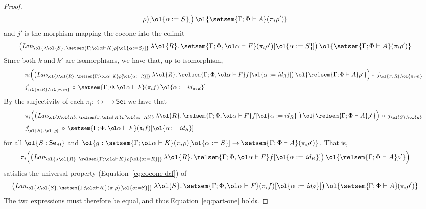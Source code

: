 \documentclass{lmcs}
\theoremstyle{plain}\newtheorem{satz}[thm]{Satz}
\newcommand{\set}{\mathsf{Set}}
\renewcommand{\id}{\mathit{id}}
\begin{document}
\begin{proof}
\[\rho)[\ol{\alpha := S}]\big)\, \ol{\setsem{\Gamma; \Phi \vdash
    A}(\pi_i \rho')}
\]
and $j'$ is the morphism mapping the cocone into the colimit
\[
\big(\textit{Lan}_{\ol{\lambda \ol{S}.\,\setsem{\Gamma; \ol\alpha
      \vdash K}\rho[\ol{\alpha := S}]}}\, \lambda
\ol{R}.\,\setsem{\Gamma; \Phi, \ol\alpha \vdash F}(\pi_i
\rho')[\ol{\alpha := S}]\big)\, \ol{\setsem{\Gamma; \Phi \vdash
    A}(\pi_i \rho')}
\]
Since both $k$ and $k'$ are isomorphisms, we have that, up to
isomorphism, 
\[\begin{array}{lll}
& & \pi_i \Big( \big(\textit{Lan}_{\ol{\lambda
    \ol{R}.\,\relsem{\Gamma; \ol\alpha \vdash K}\rho[\ol{\alpha :=
        R}]}}\, \lambda \ol{R}.\,\relsem{\Gamma; \Phi, \ol\alpha
  \vdash F}f[\ol{\alpha := \id_R}]\big)\, \ol{\relsem{\Gamma; \Phi
    \vdash A}\rho'} \Big) \circ\, j_{\ol{\pi_i R},
  \ol{\pi_i m}} \\[2ex]
& = & j'_{\ol{\pi_i R}, \ol{\pi_i m}} \,\circ\, \setsem{\Gamma; \Phi,
      \ol\alpha \vdash F} (\pi_i f)[\ol{\alpha := \id_{\pi_i R}}]
\end{array}\]
By the surjectivity of each $\pi_i : \rel \to \set$ we have that
\[\begin{array}{lll}
& & \pi_i \Big( \big(\textit{Lan}_{\ol{\lambda
    \ol{R}.\,\relsem{\Gamma; 
      \ol\alpha \vdash K}\rho[\ol{\alpha := R}]}}\, \lambda
\ol{R}.\,\relsem{\Gamma; \Phi, \ol\alpha \vdash F}f[\ol{\alpha :=
    \id_R}]\big)\, \ol{\relsem{\Gamma; \Phi \vdash A}\rho'} \Big)
\,\circ\, j_{\ol{S}, \ol{g}} \\[2ex]
& = & j'_{\ol{S}, \ol{g}} \,\circ\, \setsem{\Gamma; \Phi, \ol\alpha
  \vdash F} (\pi_i f)[\ol{\alpha := \id_{S}}]
\end{array}\]
for all $\ol{S: \set_0}$ and $\ol{g : \setsem{\Gamma; \ol\alpha \vdash
    K}(\pi_i \rho)[\ol{\alpha := S}] \to \setsem{\Gamma; \Phi \vdash
    A}(\pi_i \rho')}$.  That is, \[\pi_i \Big(
\big(\textit{Lan}_{\ol{\lambda \ol{R}.\,\relsem{\Gamma; \ol\alpha
      \vdash K}\rho[\ol{\alpha := R}]}}\, \lambda
\ol{R}.\,\relsem{\Gamma; \Phi, \ol\alpha \vdash F}f[\ol{\alpha :=
    \id_R}]\big)\, \ol{\relsem{\Gamma; \Phi \vdash A}\rho'} \Big)\]
satisfies the universal property (Equation~\ref{eq:cocone-def}) of 
\[
\big(\textit{Lan}_{\ol{\lambda \ol{S}.\,\setsem{\Gamma; \ol\alpha
      \vdash K} (\pi_1 \rho) [\ol{\alpha := S}]}}\, \lambda
\ol{S}.\,\setsem{\Gamma; \Phi, \ol\alpha \vdash F}(\pi_i f)[\ol{\alpha
    := \id_S}]\big)\, \ol{\setsem{\Gamma; \Phi \vdash A}(\pi_i \rho')}
\]
The two expressions must therefore be equal, and thus
Equation~\ref{eq:part-one} holds.


\end{proof}
\end{document}
